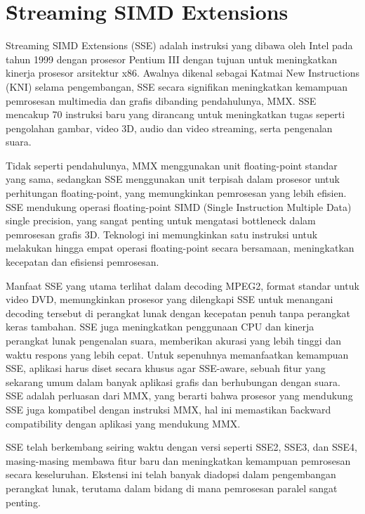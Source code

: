 \section{\f{Streaming SIMD Extensions}}
Streaming SIMD Extensions (SSE) adalah instruksi yang dibawa oleh Intel pada tahun 1999 dengan prosesor Pentium III dengan tujuan untuk meningkatkan kinerja prosesor arsitektur x86. Awalnya dikenal sebagai Katmai New Instructions (KNI) selama pengembangan, SSE secara signifikan meningkatkan kemampuan pemrosesan multimedia dan grafis dibanding pendahulunya, MMX. SSE mencakup 70 instruksi baru yang dirancang untuk meningkatkan tugas seperti pengolahan gambar, video 3D, audio dan video streaming, serta pengenalan suara\cite{informitStreamingSIMD}. 

Tidak seperti pendahulunya, MMX menggunakan unit floating-point standar yang sama, sedangkan SSE menggunakan unit terpisah dalam prosesor untuk perhitungan floating-point, yang memungkinkan pemrosesan yang lebih efisien. SSE mendukung operasi floating-point SIMD (Single Instruction Multiple Data) single precision, yang sangat penting untuk mengatasi bottleneck dalam pemrosesan grafis 3D. Teknologi ini memungkinkan satu instruksi untuk melakukan hingga empat operasi floating-point secara bersamaan, meningkatkan kecepatan dan efisiensi pemrosesan\cite{informitStreamingSIMD}. 

Manfaat SSE yang utama terlihat dalam decoding MPEG2, format standar untuk video DVD, memungkinkan prosesor yang dilengkapi SSE untuk menangani decoding tersebut di perangkat lunak dengan kecepatan penuh tanpa perangkat keras tambahan. SSE juga meningkatkan penggunaan CPU dan kinerja perangkat lunak pengenalan suara, memberikan akurasi yang lebih tinggi dan waktu respons yang lebih cepat. Untuk sepenuhnya memanfaatkan kemampuan SSE, aplikasi harus diset secara khusus agar SSE-aware, sebuah fitur yang sekarang umum dalam banyak aplikasi grafis dan berhubungan dengan suara. SSE adalah perluasan dari MMX, yang berarti bahwa prosesor yang mendukung SSE juga kompatibel dengan instruksi MMX, hal ini memastikan \f{backward compatibility} dengan aplikasi yang mendukung MMX\cite{informitStreamingSIMD}.

SSE telah berkembang seiring waktu dengan versi seperti SSE2, SSE3, dan SSE4, masing-masing membawa fitur baru dan meningkatkan kemampuan pemrosesan secara keseluruhan. Ekstensi ini telah banyak diadopsi dalam pengembangan perangkat lunak, terutama dalam bidang di mana pemrosesan paralel sangat penting.

